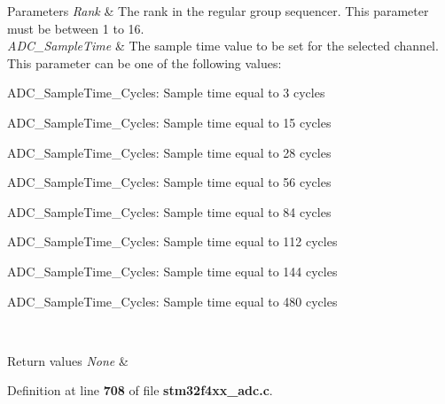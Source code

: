 \begin{DoxyParams}{Parameters}
\hline
{\em Rank} & The rank in the regular group sequencer. This parameter must be between 1 to 16. \\
\hline
{\em A\+D\+C\+\_\+\+Sample\+Time} & The sample time value to be set for the selected channel. This parameter can be one of the following values\+: \begin{DoxyItemize}
\item A\+D\+C\+\_\+\+Sample\+Time\+\_\+Cycles\+: Sample time equal to 3 cycles \item A\+D\+C\+\_\+\+Sample\+Time\+\_\+Cycles\+: Sample time equal to 15 cycles \item A\+D\+C\+\_\+\+Sample\+Time\+\_\+Cycles\+: Sample time equal to 28 cycles \item A\+D\+C\+\_\+\+Sample\+Time\+\_\+Cycles\+: Sample time equal to 56 cycles \item A\+D\+C\+\_\+\+Sample\+Time\+\_\+Cycles\+: Sample time equal to 84 cycles \item A\+D\+C\+\_\+\+Sample\+Time\+\_\+Cycles\+: Sample time equal to 112 cycles \item A\+D\+C\+\_\+\+Sample\+Time\+\_\+Cycles\+: Sample time equal to 144 cycles \item A\+D\+C\+\_\+\+Sample\+Time\+\_\+Cycles\+: Sample time equal to 480 cycles \end{DoxyItemize}
\\
\hline
\end{DoxyParams}

\begin{DoxyRetVals}{Return values}
{\em None} & \\
\hline
\end{DoxyRetVals}


Definition at line \textbf{ 708} of file \textbf{ stm32f4xx\+\_\+adc.\+c}.


